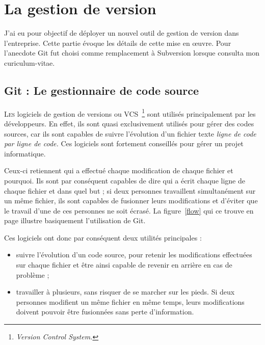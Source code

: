 \chapter{La gestion de version} %
\label{cha:La gestion de version}

\begin{it}

J'ai eu pour objectif de déployer un nouvel outil de gestion de version
dans l'entreprise. Cette partie évoque les détails de cette mise en
\oe{}uvre. Pour l'anecdote Git fut choisi comme remplacement à
Subversion lorsque \mbox{} consulta mon curiculum-vitae.

\end{it}

\section{Git : Le gestionnaire de code source} %
\label{sec:Git : Le gestionnaire de code source}

\lettrine{L}{es} logiciels de gestion de versions ou VCS\,
\footnote{\emph{Version Control System.}} sont utilisés principalement
par les développeurs. En effet, ils sont quasi exclusivement utilisés
pour gérer des codes sources, car ils sont capables de suivre
l’évolution d’un fichier texte \emph{ligne de code par ligne de code.}
Ces logiciels sont fortement conseillés pour gérer un projet
informatique.

Ceux-ci retiennent qui a effectué chaque modification de chaque fichier
et pourquoi. Ils sont par conséquent capables de dire qui a écrit chaque
ligne de chaque fichier et dans quel but ; si deux personnes travaillent
simultanément sur un même fichier, ils sont capables de fusionner leurs
modifications et d’éviter que le travail d’une de ces personnes ne soit
écrasé. La figure~\ref{flow} qui ce trouve en page \pageref{flow}
illustre basiquement l'utilisation de Git.

Ces logiciels ont donc par conséquent deux utilités principales :
\begin{itemize}

  \item suivre l’évolution d’un code source, pour retenir les
    modifications effectuées sur chaque fichier et être ainsi capable de
    revenir en arrière en cas de problème ;

  \item travailler à plusieurs, sans risquer de se marcher sur les
    pieds.  Si deux personnes modifient un même fichier en même temps,
    leurs modifications doivent pouvoir être fusionnées sans perte
    d’information.

\end{itemize}

